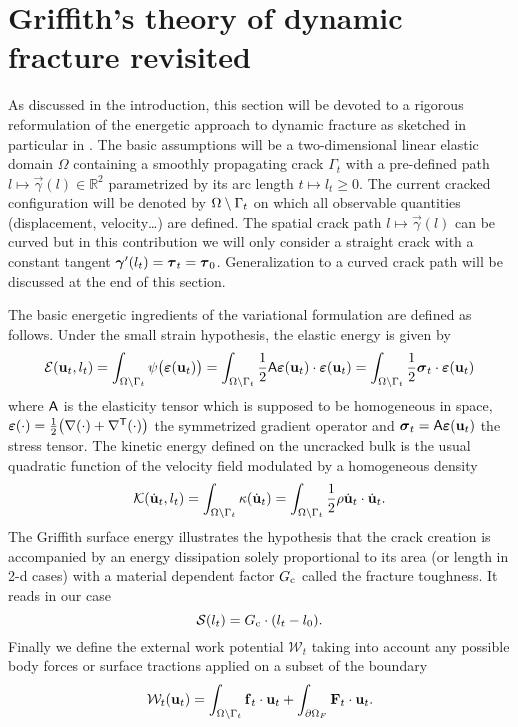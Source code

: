 \section{Griffith's theory of dynamic fracture revisited}
As discussed in the introduction, this section will be devoted to a rigorous reformulation of the energetic approach to dynamic fracture as sketched in particular in \cite{Oleaga:2001}. The basic assumptions will be a two-dimensional linear elastic domain $\Omega$ containing a smoothly propagating crack $\Gamma_t$ with a pre-defined path $l\mapsto\vec{\gamma}(l)\in\mathbb{R}^2$ parametrized by its arc length $t\mapsto l_t\geq 0$. The current cracked configuration will be denoted by ${\Omega\setminus\Gamma_t}$ on which all observable quantities (displacement, velocity\ldots) are defined. The spatial crack path $l\mapsto\vec{\gamma}(l)$ can be curved but in this contribution we will only consider a straight crack with a constant tangent $\vec{\gamma}'(l_t)=\vtau_t=\vtau_0$. Generalization to a curved crack path will be discussed at the end of this section.

The basic energetic ingredients of the variational formulation are defined as follows. Under the small strain hypothesis, the elastic energy is given by
\begin{equation} \label{eq:elastic}
\mathcal{E}(\vec{u}_t,l_t)=\int_\domaint\psi\bigl(\eps(\vec{u}_t)\bigr)=\int_\domaint\frac{1}{2}\tens{A}\eps(\vec{u}_t)\cdot\eps(\vec{u}_t)=\int_\domaint\frac{1}{2}\sig_t\cdot\eps(\vec{u}_t)
\end{equation}
where $\mathsf{A}$ is the elasticity tensor which is supposed to be homogeneous in space, $\eps(\cdot)=\frac{1}{2}\bigl(\nabla(\cdot)+\nabla^\mT(\cdot)\bigr)$ the symmetrized gradient operator and $\sig_t=\tens{A}\eps(\vec{u}_t)$ the stress tensor. The kinetic energy defined on the uncracked bulk is the usual quadratic function of the velocity field modulated by a homogeneous density
\begin{equation} \label{eq:kinetic}
\mathcal{K}(\dot{\vec{u}}_t,l_t)=\int_\domaint\kappa(\dot{\vec{u}}_t)=\int_\domaint\frac{1}{2}\rho\dot{\vec{u}}_t\cdot\dot{\vec{u}}_t.
\end{equation}
The Griffith surface energy \cite{Griffith:1921} illustrates the hypothesis that the crack creation is accompanied by an energy dissipation solely proportional to its area (or length in 2-d cases) with a material dependent factor $G_\mathrm{c}$ called the fracture toughness. It reads in our case
\begin{equation} \label{eq:griffith}
\mathcal{S}(l_t)=G_\mathrm{c}\cdot(l_t-l_0).
\end{equation}
Finally we define the external work potential $\mathcal{W}_t$ taking into account any possible body forces or surface tractions applied on a subset of the boundary
\begin{equation} \label{eq:externalwork}
\mathcal{W}_t(\vec{u}_t)=\int_\domaint \vec{f}_t\cdot\vec{u}_t+\int_{\partial\Omega_F} \vec{F}_t\cdot\vec{u}_t.
\end{equation}


